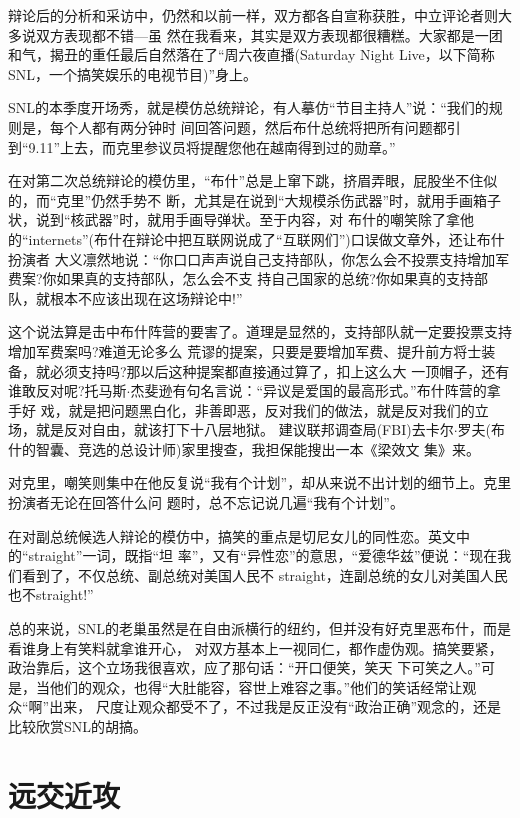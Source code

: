 ﻿\documentclass[11pt]{article}
\begin{document}
辩论后的分析和采访中，仍然和以前一样，双方都各自宣称获胜，中立评论者则大多说双方表现都不错---虽
然在我看来，其实是双方表现都很糟糕。大家都是一团和气，揭丑的重任最后自然落在了``周六夜直播(Saturday
Night Live，以下简称SNL，一个搞笑娱乐的电视节目)''身上。

SNL的本季度开场秀，就是模仿总统辩论，有人摹仿``节目主持人''说：``我们的规则是，每个人都有两分钟时
间回答问题，然后布什总统将把所有问题都引到``9.11''上去，而克里参议员将提醒您他在越南得到过的勋章。''

在对第二次总统辩论的模仿里，``布什''总是上窜下跳，挤眉弄眼，屁股坐不住似的，而``克里''仍然手势不
断，尤其是在说到``大规模杀伤武器''时，就用手画箱子状，说到``核武器''时，就用手画导弹状。至于内容，对
布什的嘲笑除了拿他的``internets''(布什在辩论中把互联网说成了``互联网们'')口误做文章外，还让布什扮演者
大义凛然地说：``你口口声声说自己支持部队，你怎么会不投票支持增加军费案?你如果真的支持部队，怎么会不支
持自己国家的总统?你如果真的支持部队，就根本不应该出现在这场辩论中!''

这个说法算是击中布什阵营的要害了。道理是显然的，支持部队就一定要投票支持增加军费案吗?难道无论多么
荒谬的提案，只要是要增加军费、提升前方将士装备，就必须支持吗?那以后这种提案都直接通过算了，扣上这么大
一顶帽子，还有谁敢反对呢?托马斯$\cdot$杰斐逊有句名言说：``异议是爱国的最高形式。''布什阵营的拿手好
戏，就是把问题黑白化，非善即恶，反对我们的做法，就是反对我们的立场，就是反对自由，就该打下十八层地狱。
建议联邦调查局(FBI)去卡尔$\cdot$罗夫(布什的智囊、竞选的总设计师)家里搜查，我担保能搜出一本《梁效文
集》来。

对克里，嘲笑则集中在他反复说``我有个计划''，却从来说不出计划的细节上。克里扮演者无论在回答什么问
题时，总不忘记说几遍``我有个计划''。

在对副总统候选人辩论的模仿中，搞笑的重点是切尼女儿的同性恋。英文中的``straight''一词，既指``坦
率''，又有``异性恋''的意思，``爱德华兹''便说：``现在我们看到了，不仅总统、副总统对美国人民不
straight，连副总统的女儿对美国人民也不straight!''


总的来说，SNL的老巢虽然是在自由派横行的纽约，但并没有好克里恶布什，而是看谁身上有笑料就拿谁开心，
对双方基本上一视同仁，都作虚伪观。搞笑要紧，政治靠后，这个立场我很喜欢，应了那句话：``开口便笑，笑天
下可笑之人。''可是，当他们的观众，也得``大肚能容，容世上难容之事。''他们的笑话经常让观众``啊''出来，
尺度让观众都受不了，不过我是反正没有``政治正确''观念的，还是比较欣赏SNL的胡搞。

\section{远交近攻}
\end{document}
